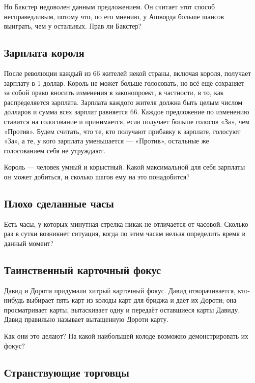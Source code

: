 Но Бакстер недоволен данным предложением.
Он считает этот способ несправедливым, потому что, по его мнению, у Ашворда больше шансов выиграть, чем у остальных.
Прав ли Бакстер?

\subsection*{Зарплата короля}%

После революции каждый из 66 жителей некой страны, включая короля, получает зарплату в 1 доллар.
Король не может больше голосовать, но всё ещё сохраняет за собой право вносить изменения в законопроект, в частности, в то, как распределяется зарплата.
Зарплата каждого жителя должна быть целым числом долларов и сумма всех зарплат равняется 66.
Каждое предложение по изменению ставится на голосование и принимается, если получает больше голосов «За», чем «Против».
Будем считать, что те, кто получают прибавку к зарплате, голосуют «За», а те, у кого зарплата уменьшается --- «Против», остальные же голосованием себя не утруждают.

Король --- человек умный и корыстный.
Какой максимальной для себя зарплаты он может добиться, и сколько шагов ему на это понадобится?

\subsection*{Плохо сделанные часы}%

Есть часы, у которых минутная стрелка никак не отличается от часовой.
Сколько раз в сутки возникнет ситуация, когда по этим часам нельзя определить время в данный момент?

 

\subsection*{Таинственный карточный фокус}%

Давид и Дороти придумали хитрый карточный фокус.
Давид отворачивается, кто-нибудь выбирает пять карт из колоды карт для бриджа и даёт их Дороти; она просматривает карты, вытаскивает одну и передаёт оставшиеся карты Давиду.
Давид правильно называет вытащенную Дороти карту.

Как они это делают?
На какой наибольшей колоде возможно демонстрировать их фокус?

\subsection*{Странствующие торговцы}%

